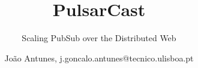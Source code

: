 \documentclass{./llncs2e/llncs}
\begin{document}
\title{PulsarCast}

\subtitle{Scaling PubSub over the Distributed Web}
\author{João Antunes, j.goncalo.antunes@tecnico.ulisboa.pt}

\maketitle

\setcounter{tocdepth}{2}
\makeatletter
\renewcommand*\l@author[2]{}
\renewcommand*\l@title[2]{}
\makeatletter

\cleardoublepage



\cleardoublepage
\tableofcontents
\cleardoublepage
\pagestyle{plain}

\cleardoublepage

\cleardoublepage

\cleardoublepage

\cleardoublepage

\cleardoublepage

\cleardoublepage
\newpage
\appendix

\cleardoublepage


%
%


\end{document}

